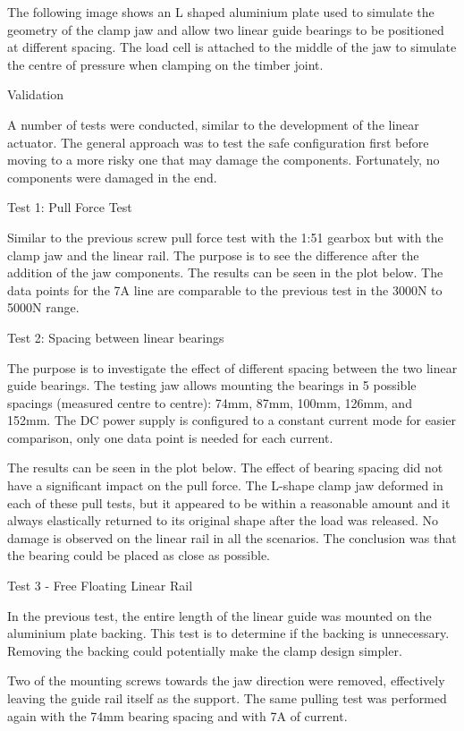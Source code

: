 \begin{itemize}
The following image shows an L shaped aluminium plate used to simulate the geometry of the clamp jaw and allow two linear guide bearings to be positioned at different spacing. The load cell is attached to the middle of the jaw to simulate the centre of pressure when clamping on the timber joint.


Validation

A number of tests were conducted, similar to the development of the linear actuator. The general approach was to test the safe configuration first before moving to a more risky one that may damage the components. Fortunately, no components were damaged in the end.

Test 1: Pull Force Test

Similar to the previous screw pull force test with the 1:51 gearbox but with the clamp jaw and the linear rail. The purpose is to see the difference after the addition of the jaw components. The results can be seen in the plot below. The data points for the 7A line are comparable to the previous test in the 3000N to 5000N range. 


Test 2: Spacing between linear bearings

The purpose is to investigate the effect of different spacing between the two linear guide bearings. The testing jaw allows mounting the bearings in 5 possible spacings (measured centre to centre): 74mm, 87mm, 100mm, 126mm, and 152mm. The DC power supply is configured to a constant current mode for easier comparison, only one data point is needed for each current. 

The results can be seen in the plot below. The effect of bearing spacing did not have a significant impact on the pull force. The L-shape clamp jaw deformed in each of these pull tests, but it appeared to be within a reasonable amount and it always elastically returned to its original shape after the load was released. No damage is observed on the linear rail in all the scenarios. The conclusion was that the bearing could be placed as close as possible.

Test 3 - Free Floating Linear Rail

In the previous test, the entire length of the linear guide was mounted on the aluminium plate backing. This test is to determine if the backing is unnecessary. Removing the backing could potentially make the clamp design simpler.

Two of the mounting screws towards the jaw direction were removed, effectively leaving the guide rail itself as the support. The same pulling test was performed again with the 74mm bearing spacing and with 7A of current.


\end{itemize}
